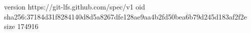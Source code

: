 version https://git-lfs.github.com/spec/v1
oid sha256:37184d31f8284140d8d5a8267dfe128ae9aa4b2fd50bea6b79d245d183af2f2e
size 174916
